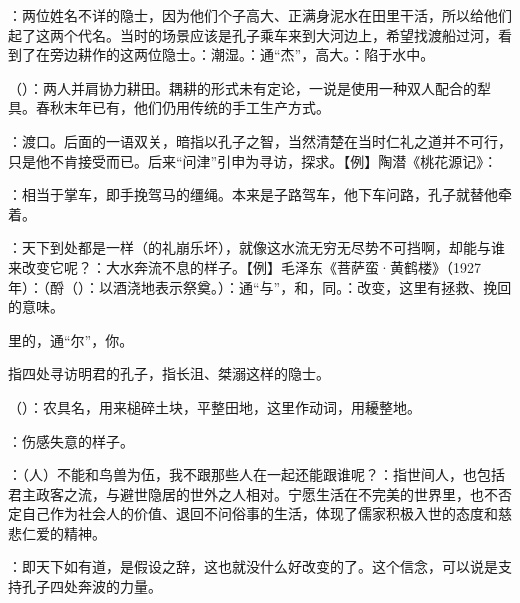 {
\item {}：两位姓名不详的隐士，因为他们个子高大、正满身泥水在田里干活，所以给他们起了这两个代名。当时的场景应该是孔子乘车来到大河边上，希望找渡船过河，看到了在旁边耕作的这两位隐士。：潮湿。：通“杰”，高大。：陷于水中。

\item {}（）：两人并肩协力耕田。耦耕的形式未有定论，一说是使用一种双人配合的犁具。春秋末年已有，他们仍用传统的手工生产方式。

\item {}：渡口。后面的一语双关，暗指以孔子之智，当然清楚在当时仁礼之道并不可行，只是他不肯接受而已。后来“问津”引申为寻访，探求。【例】陶潜《桃花源记》：

\item {}：相当于掌车，即手挽驾马的缰绳。本来是子路驾车，他下车问路，孔子就替他牵着。

\item {}：天下到处都是一样（的礼崩乐坏），就像这水流无穷无尽势不可挡啊，却能与谁来改变它呢？：大水奔流不息的样子。【例】毛泽东《菩萨蛮·黄鹤楼》（1927年）：（酹（）：以酒浇地表示祭奠。）：通“与”，和，同。：改变，这里有拯救、挽回的意味。
\item {}里的，通“尔”，你。
\item {}指四处寻访明君的孔子，指长沮、桀溺这样的隐士。
\item {}（）：农具名，用来槌碎土块，平整田地，这里作动词，用耰整地。
\item {}：伤感失意的样子。
\item {}：（人）不能和鸟兽为伍，我不跟那些人在一起还能跟谁呢？：指世间人，也包括君主政客之流，与避世隐居的世外之人相对。宁愿生活在不完美的世界里，也不否定自己作为社会人的价值、退回不问俗事的生活，体现了儒家积极入世的态度和慈悲仁爱的精神。
\item {}：即天下如有道，是假设之辞，这也就没什么好改变的了。这个信念，可以说是支持孔子四处奔波的力量。
}
{}  %


